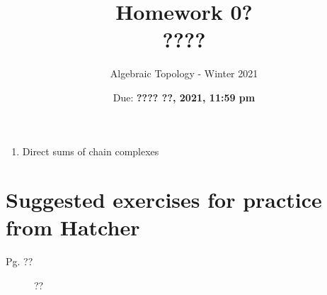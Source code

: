 \documentclass{article}
\title{Homework 0? \\ ????}
\author{Algebraic Topology - Winter 2021}
\date{Due: \textbf{???? ??, 2021, 11:59 pm}}
\begin{document}
\maketitle

\begin{enumerate}
    \item Direct sums of chain complexes
\end{enumerate}

\newpage
\section*{Suggested exercises for practice from Hatcher}

\begin{description}
\item[Pg. ??] ??
\end{description}
\end{document}
